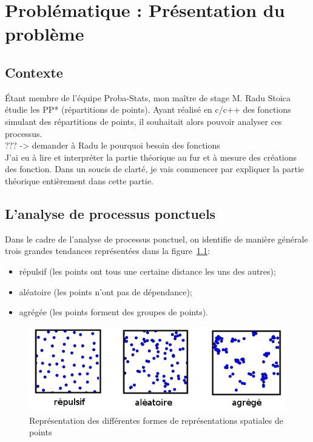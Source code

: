 \documentclass[stage2a]{tnreport}
\begin{document}
\newpage


\chapter{Problématique : Présentation du problème }



\section{Contexte} 

Étant membre de l'équipe Proba-Stats, mon maître de stage M. Radu Stoica étudie les \gls{PP}* (répartitions de points). Ayant réalisé en c/c++ des fonctions simulant des répartitions de points, il souhaitait alors pouvoir analyser ces processus.\\

??? -> demander à Radu le pourquoi besoin des fonctions\\

J'ai eu à lire et interpréter la partie théorique au fur et à mesure des créations des fonction. Dans un soucis de clarté, je vais commencer par expliquer la partie théorique entièrement dans cette partie. 


\section{L'analyse de processus ponctuels}

Dans le cadre de l'analyse de processus ponctuel, on identifie de manière générale trois grandes tendances représentées dans la figure~\ref{fig:repartition}:
\begin{itemize}
\item répulsif (les points ont tous une certaine distance les uns des autres);
\item aléatoire (les points n'ont pas de dépendance);
\item agrégée (les points forment des groupes de points).
\end{itemize}

\begin{figure}[h]
  \centering
  \includegraphics[scale=0.6]{figures/repartition2.png}
  \caption{Représentation des différentes formes de représentations spatiales de points}
  \label{fig:repartition}
\end{figure}
\end{document}

